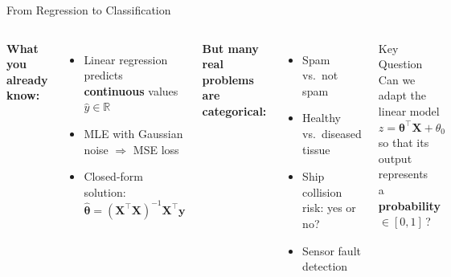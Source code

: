 \documentclass[aspectratio=169,11pt]{beamer}
\begin{document}
\begin{frame}{From Regression to Classification}
\begin{columns}[T]
\textbf{What you already know:}
\begin{itemize}
  \item Linear regression predicts \textbf{continuous} values $\hat{y}\in\mathbb{R}$
  \item MLE with Gaussian noise $\Rightarrow$ MSE loss
  \item Closed-form solution: $\hat{\boldsymbol{\theta}}=(\mathbf{X}^\top\mathbf{X})^{-1}\mathbf{X}^\top\boldsymbol{y}$
\end{itemize}
\vspace{0.6em}
\textbf{But many real problems are categorical:}
\begin{itemize}
  \item Spam vs.\ not spam
  \item Healthy vs.\ diseased tissue
  \item Ship collision risk: yes or no?
  \item Sensor fault detection
\end{itemize}

\begin{block}{Key Question}
\centering
Can we adapt the linear model\\[0.3em]
$z = \boldsymbol{\theta}^\top\mathbf{X} + \theta_0$\\[0.3em]
so that its output represents\\
a \textbf{probability} $\in[0,1]$\,?
\end{block}
\vspace{0.5em}
\end{columns}
\end{frame}
\end{document}
